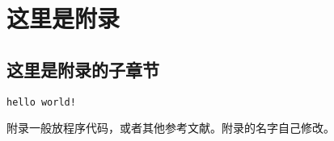 \appendix
{}
\chapter{这里是附录}
\section{这里是附录的子章节}
\begin{spacing}{1.0}
\begin{verbatim}
hello world!
\end{verbatim}
\end{spacing}

附录一般放程序代码，或者其他参考文献。附录的名字自己修改。
